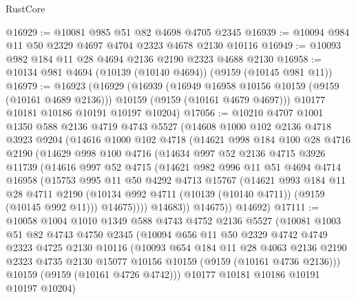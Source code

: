\begin{lexlean}{RustCore}
\begin{coremodule}
@16929 := @10081 @985 @51 @82 @4698 @4705 @2345
@16939 := @10094 @984 @11 @50 @2329 @4697 @4704 @2323 @4678 @2130 @10116
@16949 := @10093 @982 @184 @11 @28 @4694 @2136 @2190 @2323 @4688 @2130
@16958 := @10134 @981 @4694 (@10139 (@10140 @4694)) (@9159 (@10145 @981 @11))
@16979 := @16923
    (@16929
      (@16939
        (@16949 @16958 @10156 @10159 (@9159 (@10161 @4689 @2136)))
        @10159
        (@9159 (@10161 @4679 @4697)))
      @10177
      @10181
      @10186
      @10191
      @10197
      @10204)
@17056 := @10210
    @4707
    @1001
    @1350
    @588
    @2136
    @4719
    @4743
    @5527
    (@14608
      @1000
      @102
      @2136
      @4718
      @3923
      @9204
      (@14616
        @1000
        @102
        @4718
        (@14621
          @998
          @184
          @100
          @28
          @4716
          @2190
          (@14629
            @998
            @100
            @4716
            (@14634
              @997
              @52
              @2136
              @4715
              @3926
              @11739
              (@14616
                @997
                @52
                @4715
                (@14621
                  @982
                  @996
                  @11
                  @51
                  @4694
                  @4714
                  @16958
                  (@15753
                    @995
                    @11
                    @50
                    @4292
                    @4713
                    @15767
                    (@14621
                      @993
                      @184
                      @11
                      @28
                      @4711
                      @2190
                      (@10134 @992 @4711 (@10139 (@10140 @4711)) (@9159 (@10145 @992 @11)))
                      @14675))))
              @14683))
          @14675))
      @14692)
@17111 := @10058
    @1004
    @1010
    @1349
    @588
    @4743
    @4752
    @2136
    @5527
    (@10081
      @1003
      @51
      @82
      @4743
      @4750
      @2345
      (@10094
        @656
        @11
        @50
        @2329
        @4742
        @4749
        @2323
        @4725
        @2130
        @10116
        (@10093
          @654
          @184
          @11
          @28
          @4063
          @2136
          @2190
          @2323
          @4735
          @2130
          @15077
          @10156
          @10159
          (@9159 (@10161 @4736 @2136)))
        @10159
        (@9159 (@10161 @4726 @4742)))
      @10177
      @10181
      @10186
      @10191
      @10197
      @10204)

\end{coremodule}
\end{lexlean}
